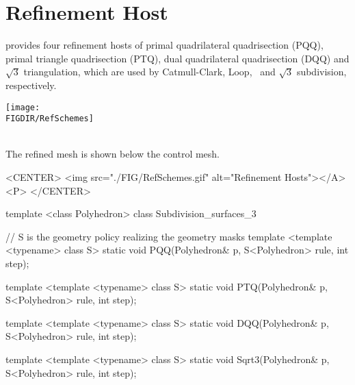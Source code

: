 \section{Refinement Host}
 provides four refinement hosts of primal 
quadrilateral quadrisection (PQQ), primal triangle 
quadrisection (PTQ), dual quadrilateral 
quadrisection (DQQ) and $\sqrt{3}$ triangulation, which 
are used by Catmull-Clark, Loop, \DS\ and $\sqrt{3}$ subdivision, 
respectively. 

\begin{ccTexOnly}
  \begin{center}
    \parbox{0.6\textwidth}{%
      \texttt{[image: \\FIGDIR/RefSchemes]}%
    }\\ \vspace{0.5cm}
    The refined mesh is shown below the control mesh.
  \end{center}
\end{ccTexOnly}

\begin{ccHtmlOnly}
  <CENTER>
     <img src="./FIG/RefSchemes.gif" alt="Refinement Hosts"></A><P>
  </CENTER>
\end{ccHtmlOnly}


\begin{ccExampleCode}
template <class Polyhedron>
class Subdivision_surfaces_3 {
  // S is the geometry policy realizing the geometry masks
  template <template <typename> class S>
  static void PQQ(Polyhedron& p, S<Polyhedron> rule, int step);

  template <template <typename> class S>
  static void PTQ(Polyhedron& p, S<Polyhedron> rule, int step);

  template <template <typename> class S>
  static void DQQ(Polyhedron& p, S<Polyhedron> rule, int step);

  template <template <typename> class S>
  static void Sqrt3(Polyhedron& p, S<Polyhedron> rule, int step);
}
\end{ccExampleCode}


